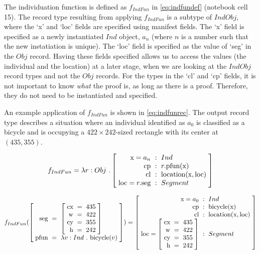 The individuation function is defined as $f_{IndFun}$ in \autoref{eq:indfundef} (notebook cell 15).
The record type resulting from applying $f_{IndFun}$ is a subtype of $IndObj$, where the `x' and `loc' fields are specified using manifest fields.
The `x' field is specified as a newly instantiated $Ind$ object, $a_n$ (where $n$ is a number such that the new instatiation is unique).
The `loc' field is specified as the value of `seg' in the $Obj$ record.
Having these fields specified allows us to access the values (the individual and the location) at a later stage, when we are looking at the $IndObj$ record types and not the $Obj$ records.
For the types in the `cl' and `cp' fields, it is not important to know \textit{what} the proof is, as long as there is a proof.
Therefore, they do not need to be instantiated and specified.


An example application of $f_{IndFun}$ is shown in \autoref{eq:indfunrec}.
The output record type describes a situation where an individual identified as $a_0$ is classified as a bicycle and is occupying a $422 \times 242$-sized rectangle with its center at $(435, 355)$.

\begin{equation}\label{eq:indfundef}
f_{IndFun} = \lambda r : Obj\ . \rec{
    \text{x} = a_n &:& Ind \\
    \text{cp} &:& r.\text{pfun}(\text{x}) \\
    \text{cl} &:& \text{location}(\text{x}, \text{loc}) \\
    \text{loc} = r.\text{seg} &:& Segment\\
}
\end{equation}

\begin{equation}\label{eq:indfunrec}
f_{IndFun}(
\rec{
\text{seg} &=& \rec{
\text{cx} &=& 435\\
\text{w} &=& 422\\
\text{cy} &=& 355\\
\text{h} &=& 242
}\\
\text{pfun} &=& \lambda v:Ind\ .\ \text{bicycle}(v)\\
}
) =
\rec{
    \text{x} = a_0 &:& Ind \\
    \text{cp} &:& \text{bicycle}(\text{x}) \\
    \text{cl} &:& \text{location}(\text{x}, \text{loc}) \\
    \text{loc} = \rec{
        \text{cx} &=& 435\\
        \text{w} &=& 422\\
        \text{cy} &=& 355\\
        \text{h} &=& 242
		} &:& Segment\\
}
\end{equation}



